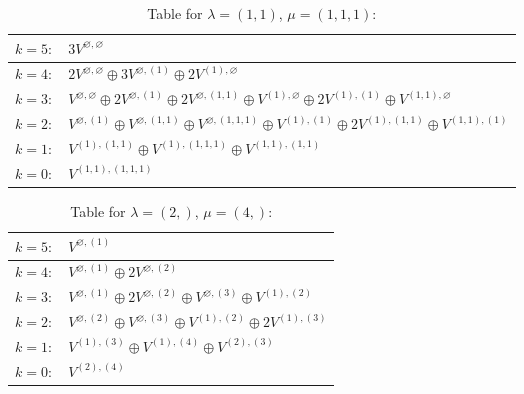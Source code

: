 \documentclass[a4paper,12pt]{article}
\begin{document}
\renewcommand{\arraystretch}{1.6} 
\begin{table}[H]
\centering
\caption{Table for $\lambda = (1, 1)$, $\mu = (1, 1, 1)$:}
\begin{tabular}{|>{\centering\arraybackslash}p{15cm}|}
\hline
 $k = 5: \quad 3 V^{\varnothing, \varnothing} $ \\ \hline
 $k = 4: \quad 2 V^{\varnothing, \varnothing} \oplus 3 V^{\varnothing, (1)} \oplus 2 V^{(1), \varnothing} $ \\ \hline
 $k = 3: \quad V^{\varnothing, \varnothing} \oplus 2 V^{\varnothing, (1)} \oplus 2 V^{\varnothing, (1, 1)} \oplus V^{(1), \varnothing} \oplus 2 V^{(1), (1)} \oplus V^{(1, 1), \varnothing} $ \\ \hline
 $k = 2: \quad V^{\varnothing, (1)} \oplus V^{\varnothing, (1, 1)} \oplus V^{\varnothing, (1, 1, 1)} \oplus V^{(1), (1)} \oplus 2 V^{(1), (1, 1)} \oplus V^{(1, 1), (1)} $ \\ \hline
 $k = 1: \quad V^{(1), (1, 1)} \oplus V^{(1), (1, 1, 1)} \oplus V^{(1, 1), (1, 1)} $ \\ \hline
 $k = 0: \quad V^{(1, 1), (1, 1, 1)} $ \\ \hline
\end{tabular}
\end{table}

\renewcommand{\arraystretch}{1.6} 
\begin{table}[H]
\centering
\caption{Table for $\lambda = (2,)$, $\mu = (4,)$:}
\begin{tabular}{|>{\centering\arraybackslash}p{15cm}|}
\hline
 $k = 5: \quad V^{\varnothing, (1)} $ \\ \hline
 $k = 4: \quad V^{\varnothing, (1)} \oplus 2 V^{\varnothing, (2)} $ \\ \hline
 $k = 3: \quad V^{\varnothing, (1)} \oplus 2 V^{\varnothing, (2)} \oplus V^{\varnothing, (3)} \oplus V^{(1), (2)} $ \\ \hline
 $k = 2: \quad V^{\varnothing, (2)} \oplus V^{\varnothing, (3)} \oplus V^{(1), (2)} \oplus 2 V^{(1), (3)} $ \\ \hline
 $k = 1: \quad V^{(1), (3)} \oplus V^{(1), (4)} \oplus V^{(2), (3)} $ \\ \hline
 $k = 0: \quad V^{(2), (4)} $ \\ \hline
\end{tabular}
\end{table}
\end{document}
